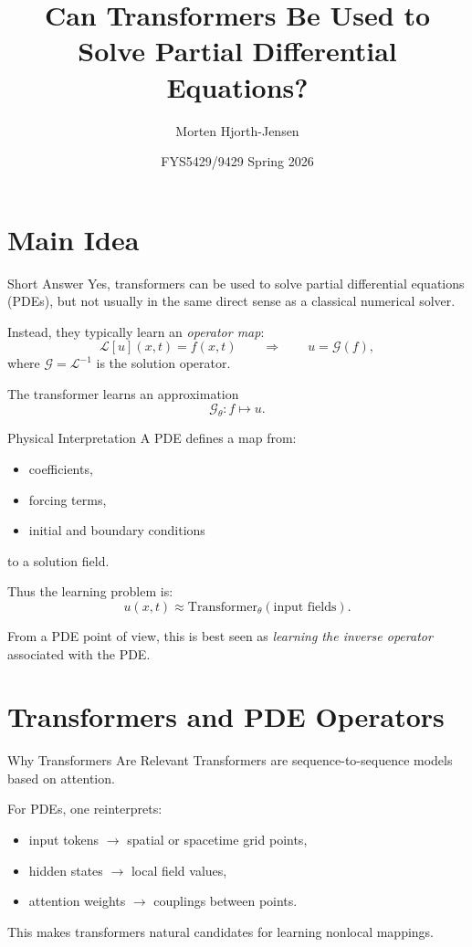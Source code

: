 \documentclass{beamer}
\title{Can Transformers Be Used to Solve Partial Differential Equations?}
\author{Morten Hjorth-Jensen}
\date{FYS5429/9429 Spring 2026}
\begin{document}
\frame{\titlepage}

\section{Main Idea}

\begin{frame}{Short Answer}
Yes, transformers can be used to solve partial differential equations (PDEs), but not usually in the same direct sense as a classical numerical solver.

\medskip

Instead, they typically learn an \emph{operator map}:
\[
\mathcal{L}[u](x,t) = f(x,t)
\qquad \Longrightarrow \qquad
u = \mathcal{G}(f),
\]
where \(\mathcal{G}=\mathcal{L}^{-1}\) is the solution operator.

\medskip

The transformer learns an approximation
\[
\mathcal{G}_\theta : f \mapsto u.
\]
\end{frame}


\begin{frame}{Physical Interpretation}
A PDE defines a map from:
\begin{itemize}
\item coefficients,
\item forcing terms,
\item initial and boundary conditions
\end{itemize}
to a solution field.

\medskip

Thus the learning problem is:
\[
u(x,t) \approx \mathrm{Transformer}_\theta(\text{input fields}).
\]

From a PDE point of view, this is best seen as \emph{learning the inverse operator} associated with the PDE.
\end{frame}

\section{Transformers and PDE Operators}

\begin{frame}{Why Transformers Are Relevant}
Transformers are sequence-to-sequence models based on attention.

\medskip

For PDEs, one reinterprets:
\begin{itemize}
\item input tokens \(\rightarrow\) spatial or spacetime grid points,
\item hidden states \(\rightarrow\) local field values,
\item attention weights \(\rightarrow\) couplings between points.
\end{itemize}

This makes transformers natural candidates for learning nonlocal mappings.
\end{frame}
\end{document}
